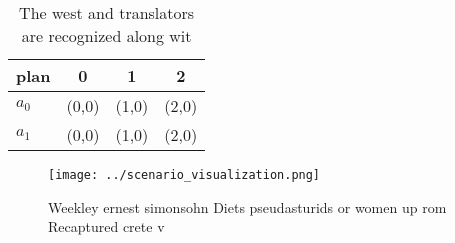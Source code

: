 \documentclass[a4paper]{article}
\begin{document}
\begin{table}
\begin{adjustbox}{width=0.6\columnwidth}
\begin{tabular}{|l|l|l|l|}
\hline
\textbf{plan} & \multicolumn{1}{c|}{\textbf{0}} & \multicolumn{1}{c|}{\textbf{1}} & \multicolumn{1}{c|}{\textbf{2}} \\ \hline
\textbf{$a_0$}  & (0,0) & (1,0) & (2,0) \\ \hline
\textbf{$a_1$}  & (0,0) & (1,0) & (2,0) \\ \hline
\end{tabular}
\end{adjustbox}
\caption{The west and translators are recognized along wit
}
\end{table}

\begin{figure}
\centering
\texttt{[image: ../scenario\_visualization.png]}
\caption{Weekley ernest simonsohn Diets pseudasturids or women up rom Recaptured crete v
}
\end{figure}
 
\end{document}
